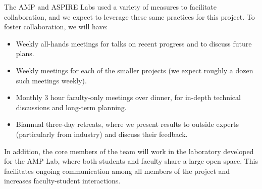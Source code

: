 The AMP and ASPIRE Labs used a variety of measures to facilitate collaboration, and we expect to leverage these same practices for this project.   To foster collaboration, we will have:

\begin{itemize}[noitemsep,topsep=0pt,parsep=0pt,partopsep=0pt]
\item Weekly all-hands meetings for talks on recent progress and to discuss future plans.
\item  Weekly meetings for each of the smaller projects (we expect roughly a dozen such meetings weekly).
\item  Monthly 3 hour faculty-only meetings over dinner, for in-depth technical discussions and long-term planning.
\item  Biannual three-day retreats, where we present results to outside experts (particularly from industry) and discuss their feedback.
\end{itemize}

In addition, the core members of the team will work in the laboratory developed for the AMP Lab, where both students and faculty share a large open space.  This facilitates ongoing communication among all members of the project and increases faculty-student interactions.


